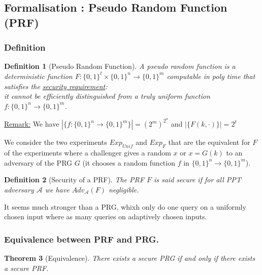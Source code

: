 \documentclass{article}
\newtheorem{thm}{Theorem}[section]
\newtheorem{defi}[thm]{Definition}
\newcommand{\Thm}[3]{\begin{thm}[#1]\label{#2}#3\end{thm}}
\newcommand{\Def}[3]{\begin{defi}[#1]\label{#2}#3\end{defi}}
\newcommand{\Rem}{\underline{Remark:} }
\newcommand{\A}{\mathcal{A}}
\newcommand{\bit}{\{0,1\}}
\begin{document}
\subsection{Formalisation : Pseudo Random Function (PRF)}
\subsubsection{Definition}
\Def{Pseudo Random Function}{def:PRF}{A pseudo random function is a deterministic function $F:\bit^t\times\bit^n\rightarrow\bit^m$ computable in poly time that satisfies the \underline{security requirement}:\\
it cannot be efficiently distinguished from a truly uniform function $f:\bit^n\rightarrow\bit^m$.}

\Rem We have $|\{f:\bit^n\rightarrow\bit^m\}|=(2^m)^{2^n}$ and $|\{F(k,\cdot)\}|=2^t$

We consider the two experiments $Exp_{Unif}$ and $Exp_F$ that are the equivalent for $F$ of the experiments where a challenger gives a random $x$ or $x=G(k)$ to an adversary of the PRG $G$ (it chooses a random function $f$ in $\bit^n\rightarrow\bit^m$). 

\begin{center}
\end{center}

\Def{Security of a PRF}{def securePRF}{The PRF $F$ is said secure if for all PPT adversary $\A$ we have $Adv_\A(F)$ negligible.} 

It seems much stronger than a PRG, whixh only do one query on a uniformly chosen input where as many queries on adaptively chosen inputs.

\subsubsection{Equivalence between PRF and PRG.}
\Thm{Equivalence}{thm:equivPRGPRF}{There exists a secure PRG if and only if there exists a secure PRF.}
\end{document}
